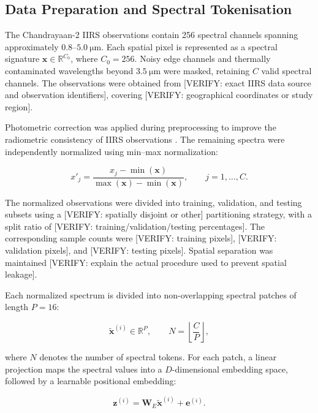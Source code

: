 \documentclass[runningheads]{llncs}
\begin{document}
\subsection{Data Preparation and Spectral Tokenisation}
\label{subsec:data_tokenisation}

The Chandrayaan-2 IIRS observations contain 256 spectral channels
spanning approximately $0.8$--$5.0~\si{\micro\metre}$. Each spatial
pixel is represented as a spectral signature
$\mathbf{x}\in\mathbb{R}^{C_0}$, where $C_0=256$. Noisy edge channels
and thermally contaminated wavelengths beyond
$3.5~\si{\micro\metre}$ were masked, retaining $C$ valid spectral
channels. The observations were obtained
from [VERIFY: exact IIRS data source and observation identifiers],
covering [VERIFY: geographical coordinates or study region].

Photometric correction was applied during preprocessing to improve
the radiometric consistency of IIRS observations
\cite{sharma2024photometric}. The remaining spectra were independently
normalized using min--max normalization:

\begin{equation}
x'_j =
\frac{x_j-\min(\mathbf{x})}
{\max(\mathbf{x})-\min(\mathbf{x})},
\qquad j=1,\ldots,C .
\label{eq:normalisation}
\end{equation}

The normalized observations were divided into training, validation,
and testing subsets using a [VERIFY: spatially disjoint or other]
partitioning strategy, with a split ratio of
[VERIFY: training/validation/testing percentages]. The corresponding
sample counts were [VERIFY: training pixels],
[VERIFY: validation pixels], and [VERIFY: testing pixels].
Spatial separation was maintained [VERIFY: explain the actual
procedure used to prevent spatial leakage].

Each normalized spectrum is divided into non-overlapping spectral
patches of length $P=16$:

\begin{equation}
\tilde{\mathbf{x}}^{(i)}\in\mathbb{R}^{P},
\qquad
N=\left\lfloor\frac{C}{P}\right\rfloor ,
\label{eq:patching}
\end{equation}

where $N$ denotes the number of spectral tokens. For each patch,
a linear projection maps the spectral values into a $D$-dimensional
embedding space, followed by a learnable positional embedding:

\begin{equation}
\mathbf{z}^{(i)}
=
\mathbf{W}_{E}\tilde{\mathbf{x}}^{(i)}
+
\mathbf{e}^{(i)} .
\label{eq:embedding}
\end{equation}
\end{document}
